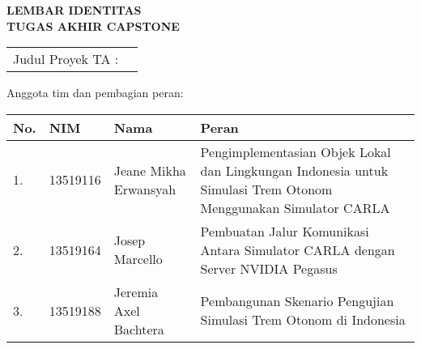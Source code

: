 \clearpage
\pagestyle{empty}

\begin{center}
	\smallskip

	\Large \bfseries \MakeUppercase{
		Lembar Identitas \\
		Tugas Akhir Capstone
	}
	\vspace{0.5cm}

	\raggedright
	\begin{table}[h!]
		\large \bfseries
		\begin{tabular}{p{} p{}}
			Judul Proyek TA : & \capstoneTitle
		\end{tabular}
	\end{table}

	\normalsize \normalfont

	Anggota tim dan pembagian peran:

	\begin{table}[h!]
		\begin{tabular}{|p{} | p{} | p{} | p{}|}
			\hline
			\textbf{No.} & \textbf{NIM} & \textbf{Nama}         & \textbf{Peran}                                                                                                 \\
			\hline
			1.           & 13519116     & Jeane Mikha Erwansyah & Pengimplementasian Objek Lokal dan Lingkungan Indonesia untuk Simulasi Trem Otonom Menggunakan Simulator CARLA \\
			\hline
			2.           & 13519164     & Josep Marcello        & Pembuatan Jalur Komunikasi Antara Simulator CARLA dengan Server NVIDIA Pegasus                                 \\
			\hline
			3.           & 13519188     & Jeremia Axel Bachtera & Pembangunan Skenario Pengujian Simulasi Trem Otonom di Indonesia                                               \\
			\hline
		\end{tabular}
	\end{table}

	\vfill
	\pembimbingTtd

\end{center}
\clearpage
